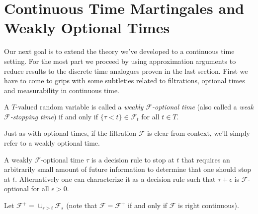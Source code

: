 \section {Continuous Time Martingales and Weakly Optional Times}

Our next goal is to extend the theory we've developed to a continuous
time setting.  For the most part we proceed by using approximation
arguments to reduce results to the discrete time analogues proven in
the last section.  First we have to come to grips with some subtleties
related to filtrations, optional times and measurability in continuous
time.

\begin{defn}A $T$-valued random variable is called a
  \emph{weakly $\mathcal{F}$-optional time} (also called a
  \emph{weak $\mathcal{F}$-stopping time}) if and only if $\lbrace \tau <
  t \rbrace \in \mathcal{F}_t$ for all $t \in T$.  
\end{defn}
Just as with optional times, if the filtration $\mathcal{F}$ is clear
from context, we'll simply refer to a weakly optional time.

A weakly $\mathcal{F}$-optional time $\tau$ is a decision rule to stop
at $t$ that requires an arbitrarily small amount of future information
to determine that one should stop at $t$.  Alternatively one can
characterize it as a decision rule such that $\tau + \epsilon$ is
$\mathcal{F}$-optional for all $\epsilon>0$.

Let $\mathcal{F}^+ = \cup_{s>t} \mathcal{F}_s$ (note that $\mathcal{F}
= \mathcal{F}^+$ if and only if $\mathcal{F}$ is right continuous).

